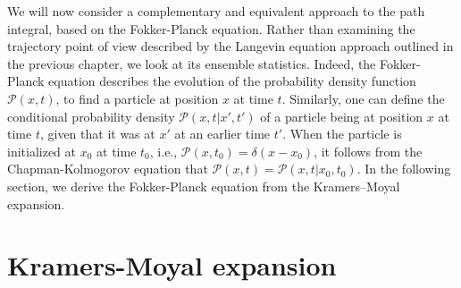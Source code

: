 We will now consider a complementary and equivalent approach to the path integral, based on the Fokker-Planck equation.
Rather than examining the trajectory point of view described by the Langevin equation approach outlined in the previous chapter, we look at its ensemble statistics. Indeed, the Fokker-Planck equation describes the evolution of the probability density function $\mathcal{P}(x,t)$, to find a particle at position $x$ at time $t$. Similarly, one can define the conditional probability density $\mathcal{P}(x,t|x',t')$ of a particle being at position $x$ at time $t$, given that it was at $x'$ at an earlier time $t'$. When the particle is initialized at $x_0$ at time $t_0$, i.e., $\mathcal{P}(x,t_0)=\delta(x-x_0)$, it follows from the Chapman-Kolmogorov equation that $\mathcal{P}(x,t)=\mathcal{P}(x,t|x_0,t_0)$.
In the following section, we derive the Fokker-Planck equation from the Kramers–Moyal expansion.

\section{Kramers-Moyal expansion}

